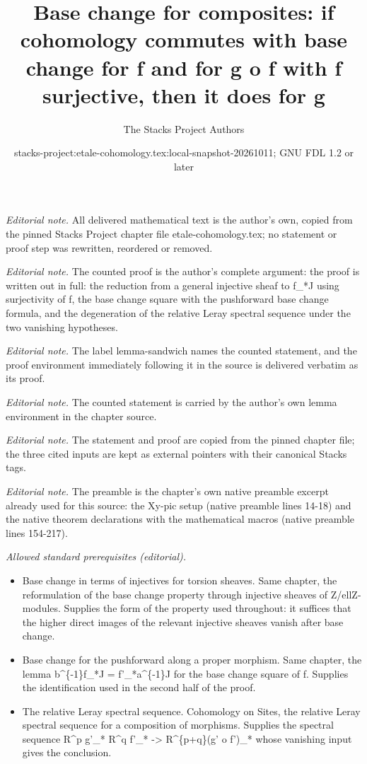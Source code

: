 \documentclass[10pt,a4paper]{amsart}
\title{Base change for composites: if cohomology commutes with base change for f and for g o f with f surjective, then it does for g}
\author{The Stacks Project Authors}
\date{stacks-project:etale-cohomology.tex:local-snapshot-20261011; GNU FDL 1.2 or later}
\theoremstyle{plain}
\theoremstyle{definition}
\theoremstyle{remark}
\numberwithin{equation}{subsection}
\begin{document}
\maketitle
\noindent\textit{Editorial note.} All delivered mathematical text is the author's own, copied from the pinned Stacks Project chapter file etale-cohomology.tex; no statement or proof step was rewritten, reordered or removed.\par\medskip
\noindent\textit{Editorial note.} The counted proof is the author's complete argument: the proof is written out in full: the reduction from a general injective sheaf to f\_*J using surjectivity of f, the base change square with the pushforward base change formula, and the degeneration of the relative Leray spectral sequence under the two vanishing hypotheses.\par\medskip
\noindent\textit{Editorial note.} The label lemma-sandwich names the counted statement, and the proof environment immediately following it in the source is delivered verbatim as its proof.\par\medskip
\noindent\textit{Editorial note.} The counted statement is carried by the author's own lemma environment in the chapter source.\par\medskip
\noindent\textit{Editorial note.} The statement and proof are copied from the pinned chapter file; the three cited inputs are kept as external pointers with their canonical Stacks tags.\par\medskip
\noindent\textit{Editorial note.} The preamble is the chapter's own native preamble excerpt already used for this source: the Xy-pic setup (native preamble lines 14-18) and the native theorem declarations with the mathematical macros (native preamble lines 154-217).\par\medskip
\noindent\textit{Allowed standard prerequisites (editorial).}\begin{itemize}
\item Base change in terms of injectives for torsion sheaves. Same chapter, the reformulation of the base change property through injective sheaves of Z/ellZ-modules. Supplies the form of the property used throughout: it suffices that the higher direct images of the relevant injective sheaves vanish after base change.
\item Base change for the pushforward along a proper morphism. Same chapter, the lemma b\textasciicircum{}\{-1\}f\_*J = f'\_*a\textasciicircum{}\{-1\}J for the base change square of f. Supplies the identification used in the second half of the proof.
\item The relative Leray spectral sequence. Cohomology on Sites, the relative Leray spectral sequence for a composition of morphisms. Supplies the spectral sequence R\textasciicircum{}p g'\_* R\textasciicircum{}q f'\_* -> R\textasciicircum{}\{p+q\}(g' o f')\_* whose vanishing input gives the conclusion.
\end{itemize}\medskip
\end{document}
